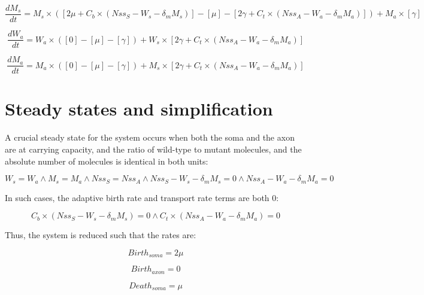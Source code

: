 \documentclass[]{article}
\begin{document}
	\begin{equation}
		\frac{d M_s}{d t} = M_s \times \left( [2\mu + C_b \times (Nss_{S}-W_s-\delta_m M_s) ] - [\mu] - [2\gamma + C_t \times (Nss_A - W_a - \delta_m M_a)]\right) + M_a \times [\gamma] 
	\end{equation}
	
	\begin{equation}
		\frac{d W_a}{d t} = W_a \times \left( [0] - [\mu] - [\gamma] \right) + W_s \times [2\gamma + C_t \times (Nss_A - W_a - \delta_m M_a)]
	\end{equation}
	
	\begin{equation}
		\frac{d M_a}{d t} = M_a \times \left( [0] - [\mu] - [\gamma] \right) + M_s \times [2\gamma + C_t \times (Nss_A - W_a - \delta_m M_a)]
	\end{equation}

\section{Steady states and simplification}
	
	A crucial steady state for the system occurs when both the soma and the axon are at carrying capacity, and the ratio of wild-type to mutant molecules, and the absolute number of molecules is identical in both units:
	
	\begin{equation}
		W_s = W_a \land M_s = M_a \land Nss_{S} = Nss_{A} \land Nss_{S}-W_s-\delta_m M_s = 0 \land Nss_{A}-W_a-\delta_m M_a = 0
	\end{equation}
	
	In such cases, the adaptive birth rate and transport rate terms are both 0:
	
	\begin{equation}
		C_b \times (Nss_{S}-W_s-\delta_m M_s) = 0 \land C_t \times (Nss_{A}-W_a-\delta_m M_a) = 0
	\end{equation}
	
	
	Thus, the system is reduced such that the rates are:
	
		\begin{equation}
		Birth_{soma} = 2\mu
	\end{equation}
	
	\begin{equation}
		Birth_{axon} = 0
	\end{equation}
	
	\begin{equation}
		Death_{soma} = \mu
	\end{equation}
	
\end{document}
